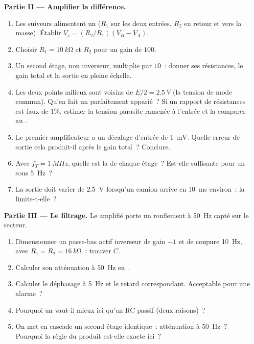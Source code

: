 \begin{problem}
\medskip
\noindent\textbf{Partie II --- Amplifier la différence.}
\begin{enumerate}[resume]
  \item Les suiveurs alimentent un  ($R_1$ sur
        les deux entrées, $R_2$ en retour et vers la masse). Établir $V_s =
        (R_2/R_1)(V_B - V_A)$.
  \item Choisir $R_1 = \qty{10}{k\ohm}$ et $R_2$ pour un gain de $100$.
  \item Un second étage, non inverseur, multiplie par $10$~: donner ses
        résistances, le gain total et la sortie en pleine échelle.
  \item Les deux points milieux sont voisins de $E/2 = \qty{2.5}{V}$ (la
        tension de mode commun). Qu'en fait un 
        parfaitement apparié~? Si un rapport de résistances est faux de
        $1\%$, estimer la tension parasite ramenée à l'entrée et la
        comparer au .
  \item Le premier amplificateur a un décalage d'entrée de \qty{1}{mV}.
        Quelle erreur de sortie cela produit-il après le gain total~?
        Conclure.
  \item Avec $f_T = \qty{1}{MHz}$, quelle est la  de chaque
        étage~? Est-elle suffisante pour un  sous \qty{5}{Hz}~?
  \item La sortie doit varier de \qty{2.5}{V} lorsqu'un camion arrive en
        \qty{10}{ms} environ~: la  limite-t-elle~?
\end{enumerate}

\medskip
\noindent\textbf{Partie III --- Le filtrage.}
Le  amplifié porte un ronflement à \qty{50}{Hz} capté sur le
secteur.
\begin{enumerate}[resume]
  \item Dimensionner un passe-bas actif inverseur de gain $-1$ et de
        coupure \qty{10}{Hz}, avec $R_1 = R_2 = \qty{16}{k\ohm}$~:
        trouver $C$.
  \item Calculer son atténuation à \qty{50}{Hz} en .
  \item Calculer le déphasage à \qty{5}{Hz} et le retard correspondant.
        Acceptable pour une alarme~?
  \item Pourquoi un  vaut-il mieux ici qu'un RC passif
        (deux raisons)~?
  \item On met en cascade un second étage identique~: atténuation à
        \qty{50}{Hz}~? Pourquoi la règle du produit est-elle exacte ici~?
\end{enumerate}


\end{problem}
